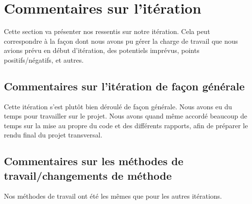 \documentclass[12pt,titlepage,french]{article}
\begin{document}
\section{Commentaires sur l'itération}

Cette section va présenter nos ressentis sur notre itération. Cela peut correspondre à la façon dont nous avons pu gérer la charge de travail que nous avions prévu en début d'itération, des potentiels imprévus, points positifs/négatifs, et autres.

\subsection{Commentaires sur l'itération de façon générale}

Cette itération s'est plutôt bien déroulé de façon générale. Nous avons eu du temps pour travailler sur le projet. Nous avons quand même accordé beaucoup de temps sur la mise au propre du code et des différents rapports, afin de préparer le rendu final du projet transversal.

\subsection{Commentaires sur les méthodes de travail/changements de méthode}

Nos méthodes de travail ont été les mêmes que pour les autres itérations.
\end{document}
